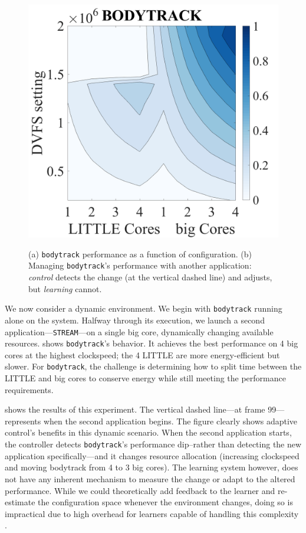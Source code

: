 \begin{figure}
\centering
    \includegraphics[width=.25\textwidth]{figures/BODYTRACK-contour.png}
    \label{fig:BODYTRACK_contour}
    
    \label{fig:BODYTRACK_timeline}
  \caption{(a) \texttt{bodytrack} performance as a function of
    configuration. (b) Managing \texttt{bodytrack}'s performance with
    another application: \emph{control} detects the change (at the
    vertical dashed line) and adjusts, but \emph{learning} cannot. }
  \label{fig:control}
\end{figure}


We now consider a dynamic environment.  We begin with
\texttt{bodytrack} running alone on the system.  Halfway through its
execution, we launch a second application---\texttt{STREAM}---on a
single big core, dynamically changing available resources.
 shows \texttt{bodytrack}'s behavior.
It achieves the best performance on 4 big cores at the highest
clockspeed; the 4 LITTLE are more energy-efficient but slower.  For
\texttt{bodytrack}, the challenge is determining how to split time
between the LITTLE and big cores to conserve energy while still
meeting the performance requirements.

 shows the results of this experiment.
The vertical dashed line---at frame 99---represents when the second
application begins.  The figure clearly shows adaptive control's
benefits in this dynamic scenario.  When the second application
starts, the controller detects \texttt{bodytrack}'s performance
dip--rather than detecting the new application specifically---and it
changes resource allocation (increasing clockspeed and moving
bodytrack from 4 to 3 big cores).  The learning system however, does
not have any inherent mechanism to measure the change or adapt to the
altered performance.  While we could theoretically add feedback to the
learner and re-estimate the configuration space whenever the
environment changes, doing so is impractical due to high overhead for
learners capable of handling this complexity
\cite{Paragon,quasar,LEO}.


